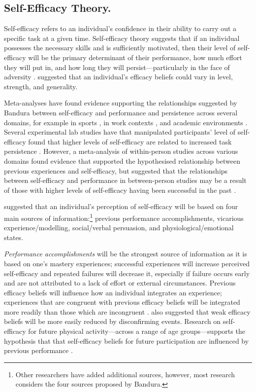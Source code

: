 \documentclass[
  12pt,
  a4paper,
]{book}
\begin{document}
\hypertarget{gen-intro-self-efficacy}{%
\subsection{Self-Efficacy Theory.}\label{gen-intro-self-efficacy}}

Self-efficacy refers to an individual's confidence in their ability to carry out a specific task at a given time. Self-efficacy theory suggests that if an individual possesses the necessary skills and is sufficiently motivated, then their level of self-efficacy will be the primary determinant of their performance, how much effort they will put in, and how long they will persist---particularly in the face of adversity \citep{Bandura1977, Bandura1982, Bandura1997}. \citet{Bandura1977} suggested that an individual's efficacy beliefs could vary in level, strength, and generality.

Meta-analyses have found evidence supporting the relationships suggested by Bandura between self-efficacy and performance and persistence across several domains, for example in sports \citep{Moritz2000}, in work contexts \citep{Stajkovic1998}, and academic environments \citep{Multon1991}. Several experimental lab studies have that manipulated participants' level of self-efficacy found that higher levels of self-efficacy are related to increased task persistence \citep{Hutchinson2008, Tenenbaum2001, Weinberg1979, Weinberg1980, Weinberg1981}. However, a meta-analysis of within-person studies across various domains found evidence that supported the hypothesised relationship between previous experiences and self-efficacy, but suggested that the relationships between self-efficacy and performance in between-person studies may be a result of those with higher levels of self-efficacy having been successful in the past \citep{Sitzmann2013}.

\citet{Bandura1982} suggested that an individual's perception of self-efficacy will be based on four main sources of information:\footnote{Other researchers \citep[e.g.,][]{Maddux1995} have added additional sources, however, most research considers the four sources proposed by Bandura.} previous performance accomplishments, vicarious experience/modelling, social/verbal persuasion, and physiological/emotional states.

\emph{Performance accomplishments} will be the strongest source of information as it is based on one's mastery experiences; successful experiences will increase perceived self-efficacy and repeated failures will decrease it, especially if failure occurs early and are not attributed to a lack of effort or external circumstances. Previous efficacy beliefs will influence how an individual integrates an experience; experiences that are congruent with previous efficacy beliefs will be integrated more readily than those which are incongruent \citep{Bandura1997, Cervone1990, Chase2001}. \citet{Bandura1997} also suggested that weak efficacy beliefs will be more easily reduced by disconfirming events. Research on self-efficacy for future physical activity---across a range of age groups---supports the hypothesis that that self-efficacy beliefs for future participation are influenced by previous performance \citep[e.g.,][]{Dawson2000, McAuley2006, Miller2002}.
\end{document}
